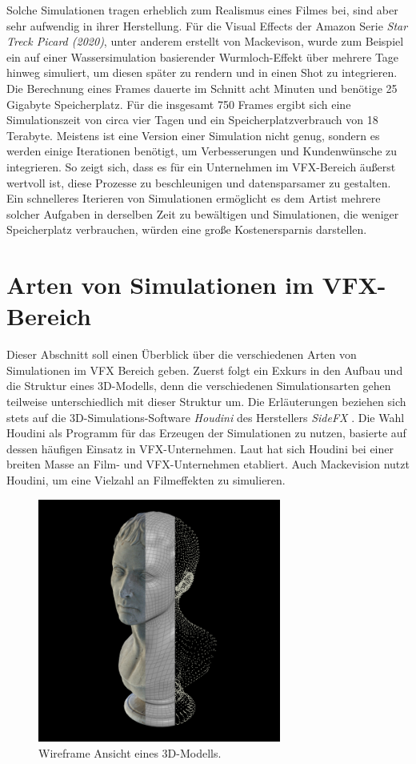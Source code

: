 Solche Simulationen tragen erheblich zum Realismus eines Filmes bei, sind aber sehr aufwendig in ihrer Herstellung. Für die Visual Effects der Amazon Serie \textit{Star Treck Picard  (2020)}, unter anderem erstellt von Mackevison, wurde zum Beispiel ein auf einer Wassersimulation basierender Wurmloch-Effekt über mehrere Tage hinweg simuliert, um diesen später zu rendern und in einen Shot zu integrieren. Die Berechnung eines Frames dauerte im Schnitt acht Minuten und benötige 25 Gigabyte Speicherplatz. Für die insgesamt 750 Frames ergibt sich eine Simulationszeit von circa vier Tagen und ein Speicherplatzverbrauch von 18 Terabyte. Meistens ist eine Version einer Simulation nicht genug, sondern es werden einige Iterationen benötigt, um Verbesserungen und Kundenwünsche zu integrieren. So zeigt sich, dass es für ein Unternehmen im VFX-Bereich äußerst wertvoll ist, diese Prozesse zu beschleunigen und datensparsamer zu gestalten. Ein schnelleres Iterieren von Simulationen ermöglicht es dem Artist mehrere solcher Aufgaben in derselben Zeit zu bewältigen und Simulationen, die weniger Speicherplatz verbrauchen, würden eine große Kostenersparnis darstellen.

\section{Arten von Simulationen im VFX-Bereich}
Dieser Abschnitt soll einen Überblick über die verschiedenen Arten von Simulationen im VFX Bereich geben. Zuerst folgt ein Exkurs in den Aufbau und die Struktur eines 3D-Modells, denn die verschiedenen Simulationsarten gehen teilweise unterschiedlich mit dieser Struktur um. Die Erläuterungen beziehen sich stets auf die 3D-Simulations-Software \textit{Houdini} des Herstellers \textit{SideFX} \parencite[]{houdini}. Die Wahl Houdini als Programm für das Erzeugen der Simulationen zu nutzen, basierte auf dessen häufigen Einsatz in VFX-Unternehmen. Laut \citet[]{kim-2022} hat sich Houdini bei einer breiten Masse an Film- und VFX-Unternehmen etabliert. Auch Mackevision nutzt Houdini, um eine Vielzahl an Filmeffekten zu simulieren.

\begin{figure}[ht]
    \centering
    \includegraphics[width=8cm]{bilder/wireframe.jpg}
    \caption{Wireframe Ansicht eines 3D-Modells.}
    \label{fig:wire}
\end{figure}

